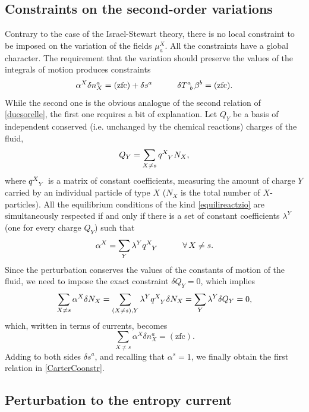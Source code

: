 \documentclass[a4paper, amsfonts, amssymb, amsmath, reprint, showkeys, nofootinbib, twoside, onecolumn,notitlepage]{revtex4-1}
\newcommand{\spc}{\quad \quad \quad}
\begin{document}
\subsection{Constraints on the second-order variations}

Contrary to the case of the Israel-Stewart theory, there is no local constraint to be imposed on the variation of the fields $\mu^X_a$. All the constraints have a global character. The requirement that the variation should preserve the values of the integrals of motion produces constraints
\begin{equation}\label{CarterCoonstr}
\alpha^X \delta n_X^a = (\text{zfc})+\delta s^a  \spc \delta T\indices{^a _b} \beta^b = (\text{zfc}).
\end{equation}
While the second one is the obvious analogue of the second relation of \eqref{duesorelle}, the first one requires a bit of explanation. Let $Q_Y$ be a basis of independent conserved (i.e. unchanged by the chemical reactions) charges of the fluid,  
\begin{equation}
Q_Y = \sum_{X \neq s} q\indices{^X _Y} N_X,
\end{equation}
where $q\indices{^X _Y}$ is a matrix of constant coefficients, measuring the amount of charge $Y$ carried by an individual particle of type $X$ ($N_X$ is the total number of $X$-particles). All the equilibrium conditions of the kind   \eqref{equilireactzio} are simultaneously respected if and only if there is a set of constant coefficients $\lambda^Y$ (one for every charge $Q_Y$) such that 
\begin{equation}
\alpha^X = \sum_Y \lambda^Y q\indices{^X _Y}  \spc  \forall \, X \neq s.
\end{equation} 
Since the perturbation conserves the values of the constants of motion of the fluid, we need to impose the exact constraint $\delta Q_Y=0$, which implies
\begin{equation}
\sum_{X \neq s} \alpha^X \delta N_X = \sum_{(X\neq s),Y} \lambda^Y q\indices{^X _Y} \delta N_X = \sum_Y \lambda^Y \delta Q_Y =0,
\end{equation}  
which, written in terms of currents, becomes
\begin{equation}
\sum_{X \neq s} \alpha^X \delta n_X^a =(\text{zfc}).
\end{equation}
Adding to both sides $\delta s^a$, and recalling that $\alpha^s=1$, we finally obtain the first relation in \eqref{CarterCoonstr}.


\subsection{Perturbation to the entropy current}\label{quilacurr}
\end{document}
